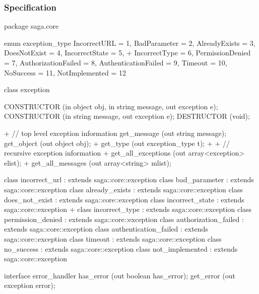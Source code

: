  
 \newpage
 
 \subsubsection{Specification}
 
 \begin{myspec}
  package saga.core
  {
    enum exception_type
    {
      IncorrectURL         =  1,
      BadParameter         =  2,
      AlreadyExists        =  3,
      DoesNotExist         =  4,
      IncorrectState       =  5,
+     IncorrectType        =  6,
      PermissionDenied     =  7,
      AuthorizationFailed  =  8,
      AuthenticationFailed =  9,
      Timeout              = 10,
      NoSuccess            = 11,
      NotImplemented       = 12
    }

    class exception
    {
      CONSTRUCTOR          (in  object           obj,
                            in  string           message,
                            out exception        e);
      CONSTRUCTOR          (in  string           message,
                            out exception        e);
      DESTRUCTOR           (void);
 
+     // top level exception information
      get_message          (out string           message);
      get_object           (out object           obj);
+     get_type             (out exception_type   t);
+
+     // recursive exception information
+     get_all_exceptions   (out array<exception> elist);
+     get_all_messages     (out array<string>    mlist);
    }
 
    class incorrect_url         : extends saga::core::exception { }
    class bad_parameter         : extends saga::core::exception { }
    class already_exists        : extends saga::core::exception { }
    class does_not_exist        : extends saga::core::exception { }
    class incorrect_state       : extends saga::core::exception { }
+   class incorrect_type        : extends saga::core::exception { }
    class permission_denied     : extends saga::core::exception { }
    class authorization_failed  : extends saga::core::exception { }
    class authentication_failed : extends saga::core::exception { }
    class timeout               : extends saga::core::exception { }
    class no_success            : extends saga::core::exception { }
    class not_implemented       : extends saga::core::exception { }
 
 
    interface error_handler
    {
      has_error            (out boolean        has_error);
      get_error            (out exception      error);
    }
  }
 \end{myspec}
 

